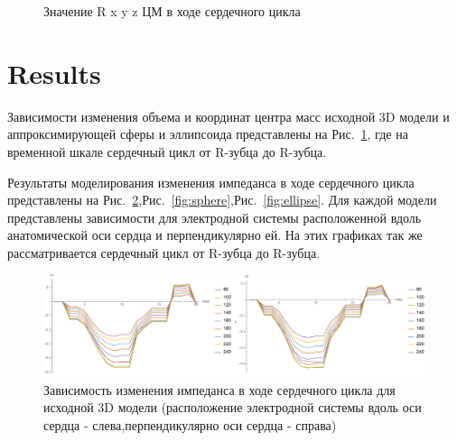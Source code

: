 \documentclass[conference]{IEEEtran}
\begin{document}
\begin{figure}[htbp]
    \caption{Значение R x y z ЦМ в ходе сердечного цикла}
    \label{fig:rxyz}
\end{figure}

\section{Results}

Зависимости изменения объема и координат центра масс исходной 3D модели и аппроксимирующей сферы и эллипсоида представлены на Рис.~\ref{fig:rxyz},
где на временной шкале сердечный цикл от R-зубца до R-зубца.

Результаты моделирования изменения импеданса в ходе сердечного цикла представлены на Рис.~\ref{real},Рис.~\ref{fig:sphere},Рис.~\ref{fig:ellipse}.
Для каждой модели представлены зависимости для электродной системы расположенной вдоль анатомической оси сердца и перпендикулярно ей.
На этих графиках так же рассматривается сердечный цикл от R-зубца до R-зубца.

\begin{figure}[tbph]
    \centering
    \includegraphics[width=\linewidth]{fig/real}
    \caption{Зависимость изменения импеданса в ходе сердечного цикла для исходной 3D модели (расположение электродной системы вдоль оси сердца - слева,перпендикулярно оси сердца - справа)}
    \label{real}
\end{figure}
\end{document}
